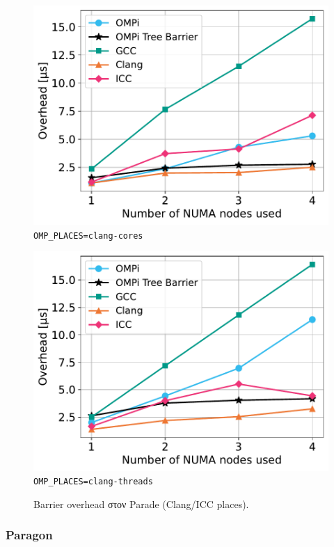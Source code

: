 \begin{figure}
    \centering
    \begin{minipage}{0.5\textwidth}
        \centering
        \includegraphics[width=1\textwidth]{Figures/epcc_20210823_175412/clang-places_cores_close.pdf}
		\texttt{OMP\_PLACES=clang-cores}
    \end{minipage}\hfill
    \begin{minipage}{0.5\textwidth}
        \centering
        \includegraphics[width=1\textwidth]{Figures/epcc_20210823_175412/clang-places_threads_close.pdf}
        \texttt{OMP\_PLACES=clang-threads}
    \end{minipage}
    \caption{Barrier overhead στον Parade (Clang/ICC places).}
    \label{fig:bo-parade-clang-places}
\end{figure}

\subsubsection{Paragon}